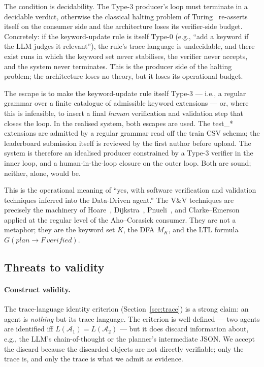 The condition is decidability.  The Type-3 producer's loop must
terminate in a decidable verdict, otherwise the classical
halting problem of Turing~\cite{turing1936computable}
re-asserts itself on the consumer side and the architecture
loses its verifier-side budget.  Concretely:  if the
keyword-update rule is itself Type-0 (e.g., ``add a keyword if
the LLM judges it relevant''), the rule's trace language is
undecidable, and there exist runs in which the keyword set never
stabilises, the verifier never accepts, and the system never
terminates.  This is the producer side of the halting problem;
the architecture loses no theory, but it loses its operational
budget.

The escape is to make the keyword-update rule itself Type-3
--- i.e., a regular grammar over a finite catalogue of
admissible keyword extensions --- or, where this is infeasible,
to insert a final \emph{human} verification and validation step
that closes the loop.  In the realised system, both escapes are
used.  The \textsf{test\_*} extensions are admitted by a regular
grammar read off the train CSV schema; the leaderboard
submission itself is reviewed by the first author before upload.
The system is therefore an idealised producer constrained by a Type-3 verifier in the
inner loop, and a human-in-the-loop closure on the outer loop.
Both are sound; neither, alone, would be.

This is the operational meaning of ``yes, with software
verification and validation techniques inferred into the
Data-Driven agent.''  The V\&V techniques are precisely the
machinery of Hoare~\cite{hoare1969axiomatic},
Dijkstra~\cite{dijkstra1975guarded},
Pnueli~\cite{pnueli1977temporal}, and
Clarke--Emerson~\cite{clarke1981ctl,clarke1999modelchecking}
applied at the regular level of the Aho--Corasick consumer.
They are not a metaphor; they are the keyword set $K$, the DFA
$M_K$, and the LTL formula
$G(\mathit{plan} \rightarrow F\,\mathit{verified})$.

\subsection{Threats to validity}

\paragraph{Construct validity.}
The trace-language identity criterion (Section~\ref{sec:trace})
is a strong claim: an agent is \emph{nothing} but its trace
language.  The criterion is well-defined --- two agents are
identified iff $L(\mathcal{A}_1) = L(\mathcal{A}_2)$ --- but it
does discard information about, e.g., the LLM's chain-of-thought
or the planner's intermediate JSON.  We accept the discard
because the discarded objects are not directly verifiable; only
the trace is, and only the trace is what we admit as evidence.


